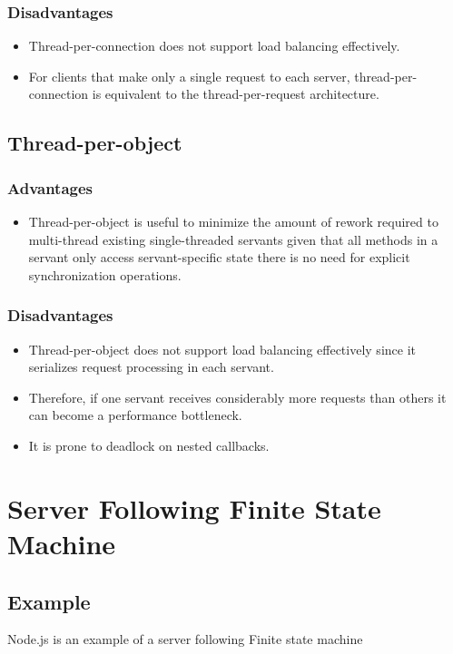 \documentclass[11pt,a4paper]{report}
\begin{document}
			\subsubsection{Disadvantages}
			\begin{itemize}
				\item Thread-per-connection does not support load balancing effectively.
				\item For clients that make only a single request to each server, thread-per-connection is equivalent to the thread-per-request architecture.
			\end{itemize}
		\subsection{Thread-per-object}
			\subsubsection{Advantages}
			\begin{itemize}
				\item Thread-per-object is useful to minimize the amount of rework required to multi-thread existing single-threaded servants given that all methods in a servant only access servant-specific state there is no need for explicit synchronization operations.				
			\end{itemize}
			\subsubsection{Disadvantages}
			\begin{itemize}
				\item Thread-per-object does not support load balancing effectively since it serializes request processing in each servant. 
				\item Therefore, if one servant receives considerably more requests than others it can become a performance bottleneck. 
				\item It is prone to deadlock on nested callbacks.				
			\end{itemize}
	
	\section{Server Following Finite State Machine}
		\subsection{Example}
		Node.js is an example of a server following Finite state machine
\end{document}

